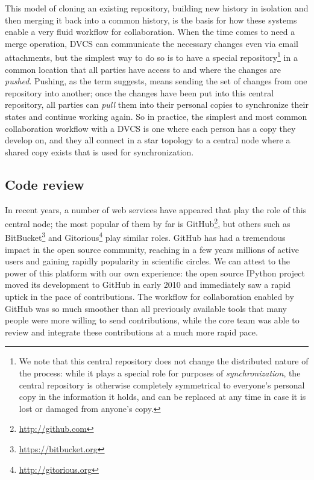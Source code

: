\documentclass[ChapterTOCs,krantz2]{krantz} %
\begin{document}
This model of cloning an existing repository, building new history in isolation
and then merging it back into a common history, is the basis for how these
systems enable a very fluid workflow for collaboration.  When the time comes to
need a merge operation, DVCS can communicate the necessary changes even
via email attachments, but the simplest way to do so is to have a special
repository\footnote{We note that this central repository does not change the
  distributed nature of the process: while it plays a special role for purposes
  of \emph{synchronization}, the central repository is otherwise completely
  symmetrical to everyone's personal copy in the information it holds, and can
  be replaced at any time in case it is lost or damaged from anyone's copy.} in
a common location that all parties have access to and where the changes are
\emph{pushed}.  Pushing, as the term suggests, means sending the set of
changes from one repository into another; once the changes have been put into
this central repository, all parties can \emph{pull} them into their personal
copies to synchronize their states and continue working again.  So in practice,
the simplest and most common collaboration workflow with a DVCS is one where
each person has a copy they develop on, and they all connect in a star topology
to a central node where a shared copy exists that is used for synchronization.

\subsection{Code review}

In recent years, a number of web services have appeared that play the role of
this central node; the most popular of them by far is
GitHub\footnote{\url{http://github.com}}, but others such as
BitBucket\footnote{\url{https://bitbucket.org}} and
Gitorious\footnote{\url{http://gitorious.org}} play similar roles.  GitHub has
had a tremendous impact in the open source community, reaching in a few years
millions of active users and gaining rapidly popularity in scientific circles.
We can attest to the power of this platform with our own experience: the open
source IPython project moved its development to GitHub in early 2010 and
immediately saw a rapid uptick in the pace of contributions.  The workflow for
collaboration enabled by GitHub was so much smoother than all previously
available tools that many people were more willing to send contributions, while
the core team was able to review and integrate these contributions at a much
more rapid pace.
\end{document}
